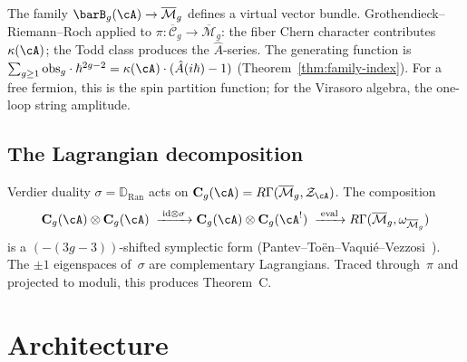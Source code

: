 The family $\barB_g(\cA) \to \overline{\mathcal{M}}_g$ defines a
virtual vector bundle.  Grothendieck--Riemann--Roch applied to
$\pi \colon \overline{\mathcal{C}}_g \to
\overline{\mathcal{M}}_g$: the fiber Chern character
contributes~$\kappa(\cA)$; the Todd class produces the
$\hat{A}$-series.  The generating function is
$\sum_{g \geq 1} \mathrm{obs}_g \cdot \hbar^{2g-2}
= \kappa(\cA) \cdot (\hat{A}(i\hbar) - 1)$
(Theorem~\ref{thm:family-index}).  For a free fermion, this is the
spin partition function; for the Virasoro algebra, the one-loop
string amplitude.

\subsection{The Lagrangian decomposition}
\label{subsec:verdier-symplectic}

Verdier duality $\sigma = \mathbb{D}_{\operatorname{Ran}}$ acts on
$\mathbf{C}_g(\cA) = R\Gamma(\overline{\mathcal{M}}_g,
\mathcal{Z}_\cA)$.  The composition
\[
\mathbf{C}_g(\cA) \otimes \mathbf{C}_g(\cA)
\;\xrightarrow{\;\mathrm{id} \otimes \sigma\;}
\mathbf{C}_g(\cA) \otimes \mathbf{C}_g(\cA^!)
\;\xrightarrow{\;\mathrm{eval}\;}
R\Gamma(\overline{\mathcal{M}}_g,
\omega_{\overline{\mathcal{M}}_g})
\]
is a $(-(3g{-}3))$-shifted symplectic form
(Pantev--To\"en--Vaqui\'e--Vezzosi~\cite{PTVV13}).  The $\pm 1$
eigenspaces of~$\sigma$ are complementary Lagrangians.  Traced
through~$\pi$ and projected to moduli, this produces Theorem~C.


\section{Architecture}

